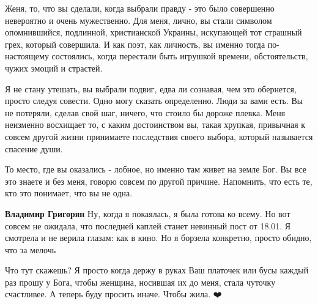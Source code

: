 \begin{itemize}
Женя, то, что вы сделали, когда выбрали правду - это было совершенно невероятно
и очень мужественно. Для меня, лично, вы стали символом опомнившийся,
подлинной, христианской Украины, искупающей тот страшный грех, который
совершила. И как поэт, как личность, вы именно тогда по-настоящему состоялись,
когда перестали быть игрушкой времени, обстоятельств, чужих эмоций и страстей.

Я не стану утешать, вы выбрали подвиг, едва ли сознавая, чем это обернется,
просто следуя совести. Одно могу сказать определенно. Люди за вами есть. Вы не
потеряли, сделав свой шаг, ничего, что стоило бы дороже плевка. Меня неизменно
восхищает то, с каким достоинством вы, такая хрупкая, привычная к совсем другой
жизни принимаете последствия своего выбора, который называется спасение души.

То место, где вы оказались - лобное, но именно там живет на земле Бог. Вы все
это знаете и без меня, говорю совсем по другой причине. Напомнить, что есть те,
кто это понимает, что вы не одна.

\begin{itemize}
 
\textbf{Владимир Григорян} Ну, когда я покаялась, я была готова ко всему. Но
вот совсем не ожидала, что последней каплей станет невинный пост от 18.01. Я
смотрела и не верила глазам: как в кино. Но я борзела конкретно, просто обидно,
что за мелочь
\end{itemize}

 

Что тут скажешь? Я просто когда держу в руках Ваш платочек или бусы каждый раз
прошу у Бога, чтобы женщина, носившая их до меня, стала чуточку счастливее. А
теперь буду просить иначе. Чтобы жила. ❤️

 

\end{itemize}
